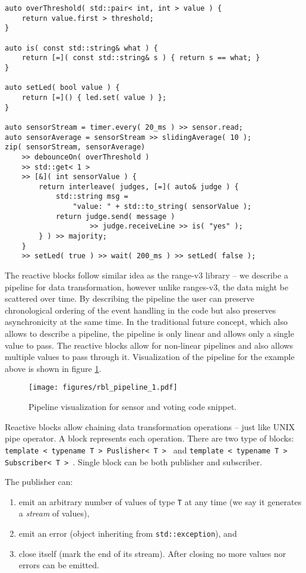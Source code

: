 \begin{verbatim}
auto overThreshold( std::pair< int, int > value ) {
    return value.first > threshold;
}

auto is( const std::string& what ) {
    return [=]( const std::string& s ) { return s == what; }
}

auto setLed( bool value ) {
    return [=]() { led.set( value ) };
}

auto sensorStream = timer.every( 20_ms ) >> sensor.read;
auto sensorAverage = sensorStream >> slidingAverage( 10 );
zip( sensorStream, sensorAverage)
    >> debounceOn( overThreshold )
    >> std::get< 1 >
    >> [&]( int sensorValue ) {
        return interleave( judges, [=]( auto& judge ) {
            std::string msg =
                "value: " + std::to_string( sensorValue );
            return judge.send( message )
                    >> judge.receiveLine >> is( "yes" );
        } ) >> majority;
    }
    >> setLed( true ) >> wait( 200_ms ) >> setLed( false );
\end{verbatim}

The reactive blocks follow similar idea as the range-v3 library -- we describe a
pipeline for data transformation, however unlike ranges-v3, the data might be
scattered over time. By describing the pipeline the user can preserve
chronological ordering of the event handling in the code but also preserves
asynchronicity at the same time. In the traditional future concept, which also
allows to describe a pipeline, the pipeline is only linear and allows only a
single value to pass. The reactive blocks allow for non-linear pipelines and
also allows multiple values to pass through it. Visualization of the pipeline
for the example above is shown in figure \ref{fig:rbl_example_1}.

\begin{figure}[!t]
    \centering
    \texttt{[image: figures/rbl\_pipeline\_1.pdf]}
    \caption{Pipeline visualization for sensor and voting code snippet.}
    \label{fig:rbl_example_1}
\end{figure}

Reactive blocks allow chaining data transformation operations -- just like UNIX
pipe operator. A block represents each operation. There are two type of blocks:
\texttt{template < typename T > Puslisher< T > } and
\texttt{template < typename T > Subscriber< T > }. Single
block can be both publisher and subscriber.

\noindent The publisher can:
\begin{enumerate}
    \item emit an arbitrary number of values of type \texttt{T} at any time (we
    say it generates a \emph{stream} of values),
    \item emit an error (object inheriting from
    \texttt{std::exception}), and
    \item close itself (mark the end of its stream). After closing no more
    values nor errors can be emitted.
\end{enumerate}

